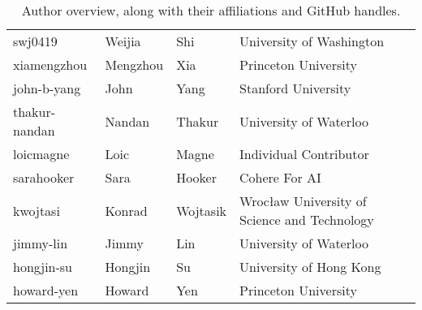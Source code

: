 \begin{table*}
{\begin{tabular}{llll}
swj0419 & Weijia & Shi & University of Washington \\
xiamengzhou & Mengzhou & Xia & Princeton University \\
john-b-yang & John & Yang & Stanford University \\
thakur-nandan & Nandan & Thakur & University of Waterloo \\
loicmagne & Loic & Magne & Individual Contributor \\
sarahooker & Sara & Hooker & Cohere For AI \\
kwojtasi & Konrad & Wojtasik & Wrocław University of Science and Technology \\
jimmy-lin & Jimmy & Lin & University of Waterloo \\
hongjin-su & Hongjin & Su & University of Hong Kong \\
howard-yen & Howard & Yen & Princeton University \\

\bottomrule
\end{tabular}
}
\caption{Author overview, along with their affiliations and GitHub handles.}
\label{tab:authors}
\end{table*}
